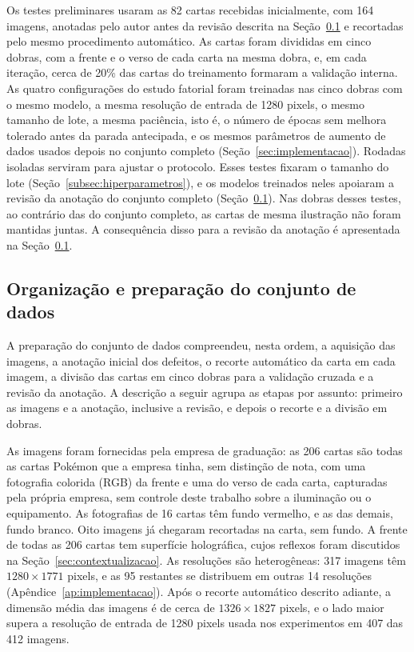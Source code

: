 \documentclass[
    12pt,                %
    openright,           %
    oneside,             %
    a4paper,             %
    english,             %
    brazil               %
]{abntex2}
\begin{document}
Os testes preliminares usaram as 82 cartas recebidas inicialmente, com 164 imagens, anotadas pelo autor antes da revisão descrita na Seção~\ref{subsec:dados} e recortadas pelo mesmo procedimento automático. As cartas foram divididas em cinco dobras, com a frente e
o verso de cada carta na mesma dobra, e, em cada iteração, cerca de 20\%
das cartas do treinamento formaram a validação interna. As quatro
configurações do estudo fatorial foram treinadas nas cinco dobras com
o mesmo modelo, a mesma resolução de entrada de 1280 pixels, o mesmo
tamanho de lote, a mesma paciência, isto é, o número de épocas sem melhora tolerado antes da parada antecipada, e os mesmos
parâmetros de aumento de dados usados depois no conjunto completo
(Seção~\ref{sec:implementacao}). Rodadas isoladas serviram para
ajustar o protocolo. Esses testes fixaram o tamanho do lote (Seção~\ref{subsec:hiperparametros}), e os modelos treinados
neles apoiaram a revisão da anotação do conjunto completo
(Seção~\ref{subsec:dados}). Nas dobras desses testes, ao contrário das
do conjunto completo, as cartas de mesma ilustração não foram mantidas
juntas. A consequência disso para a revisão da anotação é apresentada
na Seção~\ref{subsec:dados}.

\subsection{Organização e preparação do conjunto de dados}
\label{subsec:dados}

A preparação do conjunto de dados compreendeu, nesta ordem, a aquisição
das imagens, a anotação inicial dos defeitos, o recorte automático da
carta em cada imagem, a divisão das cartas em cinco dobras para a
validação cruzada e a revisão da anotação. A descrição a seguir agrupa
as etapas por assunto: primeiro as imagens e a anotação, inclusive a
revisão, e depois o recorte e a divisão em dobras.

As imagens foram fornecidas pela empresa de graduação: as 206 cartas são
todas as cartas Pokémon que a empresa tinha, sem distinção de nota, com uma fotografia
colorida (RGB) da frente e uma do verso de cada carta, capturadas pela
própria empresa, sem controle deste trabalho sobre a iluminação ou o
equipamento. As fotografias de 16 cartas têm fundo vermelho, e as das
demais, fundo branco. Oito imagens já chegaram recortadas na carta, sem
fundo. A frente de todas as 206 cartas tem superfície holográfica, cujos
reflexos foram discutidos na Seção~\ref{sec:contextualizacao}. As
resoluções são heterogêneas: 317 imagens têm $1280 \times 1771$ pixels,
e as 95 restantes se distribuem em outras 14 resoluções
(Apêndice~\ref{ap:implementacao}). Após o recorte
automático descrito adiante, a dimensão média das imagens é de cerca de
$1326 \times 1827$ pixels, e o lado maior supera a resolução de entrada de 1280 pixels usada nos experimentos em 407 das 412 imagens.
\end{document}
